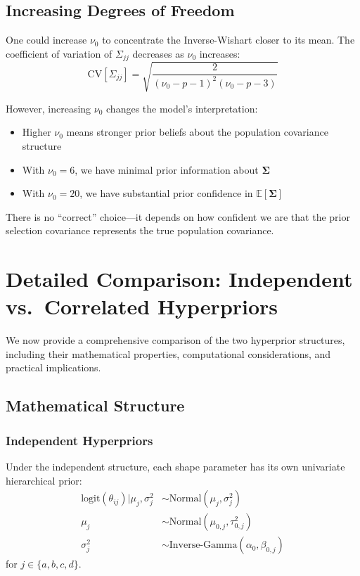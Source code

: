 \documentclass[11pt]{article}
\newcommand{\E}{\mathbb{E}}
\begin{document}
\subsection{Increasing Degrees of Freedom}

One could increase $\nu_0$ to concentrate the Inverse-Wishart closer to its mean. The coefficient of variation of $\Sigma_{jj}$ decreases as $\nu_0$ increases:
\[
  \text{CV}[\Sigma_{jj}] = \sqrt{\frac{2}{(\nu_0 - p - 1)^2(\nu_0 - p - 3)}}
\]

However, increasing $\nu_0$ changes the model's interpretation:
\begin{itemize}
  \item Higher $\nu_0$ means stronger prior beliefs about the population covariance structure
  \item With $\nu_0 = 6$, we have minimal prior information about $\boldsymbol{\Sigma}$
  \item With $\nu_0 = 20$, we have substantial prior confidence in $\E[\boldsymbol{\Sigma}]$
\end{itemize}

There is no ``correct'' choice---it depends on how confident we are that the prior selection covariance represents the true population covariance.

\section{Detailed Comparison: Independent vs.\ Correlated Hyperpriors}

We now provide a comprehensive comparison of the two hyperprior structures, including their mathematical properties, computational considerations, and practical implications.

\subsection{Mathematical Structure}

\subsubsection{Independent Hyperpriors}

Under the independent structure, each shape parameter has its own univariate hierarchical prior:
\begin{align}
  \text{logit}(\theta_{ij}) | \mu_j, \sigma_j^2 &\sim \text{Normal}(\mu_j, \sigma_j^2) \\
  \mu_j &\sim \text{Normal}(\mu_{0,j}, \tau_{0,j}^2) \\
  \sigma_j^2 &\sim \text{Inverse-Gamma}(\alpha_0, \beta_{0,j})
\end{align}
for $j \in \{a, b, c, d\}$.
\end{document}
